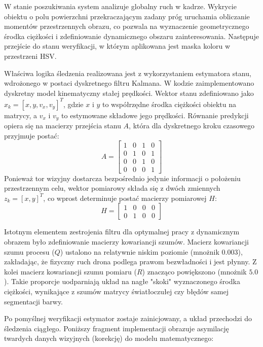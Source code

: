 \documentclass[a4paper,twoside,12pt]{book}
\begin{document}
W stanie poszukiwania system analizuje globalny ruch w kadrze. Wykrycie obiektu o polu powierzchni przekraczającym zadany próg uruchamia obliczanie momentów przestrzennych obrazu, co pozwala na wyznaczenie geometrycznego środka ciężkości i zdefiniowanie dynamicznego obszaru zainteresowania. Następuje przejście do stanu weryfikacji, w którym aplikowana jest maska koloru w przestrzeni HSV.

Właściwa logika śledzenia realizowana jest z wykorzystaniem estymatora stanu, wdrożonego w postaci dyskretnego filtru Kalmana. W kodzie zaimplementowano dyskretny model kinematyczny stałej prędkości. Wektor stanu zdefiniowano jako $x_k = [x, y, v_x, v_y]^T$, gdzie $x$ i $y$ to współrzędne środka ciężkości obiektu na matrycy, a $v_x$ i $v_y$ to estymowane składowe jego prędkości. Równanie predykcji opiera się na macierzy przejścia stanu $A$, która dla dyskretnego kroku czasowego przyjmuje postać:
\begin{equation}
A = \begin{bmatrix}
1 & 0 & 1 & 0 \\
0 & 1 & 0 & 1 \\
0 & 0 & 1 & 0 \\
0 & 0 & 0 & 1
\end{bmatrix}
\end{equation}
Ponieważ tor wizyjny dostarcza bezpośrednio jedynie informacji o położeniu przestrzennym celu, wektor pomiarowy składa się z dwóch zmiennych $z_k = [x, y]^T$, co wprost determinuje postać macierzy pomiarowej $H$:
\begin{equation}
H = \begin{bmatrix}
1 & 0 & 0 & 0 \\
0 & 1 & 0 & 0
\end{bmatrix}
\end{equation}

Istotnym elementem zestrojenia filtru dla optymalnej pracy z dynamicznym obrazem było zdefiniowanie macierzy kowariancji szumów. Macierz kowariancji szumu procesu ($Q$) ustalono na relatywnie niskim poziomie (mnożnik $0.003$), zakładając, że fizyczny ruch drona podlega prawom bezwładności i jest płynny. Z kolei macierz kowariancji szumu pomiaru ($R$) znacząco powiększono (mnożnik $5.0$). Takie proporcje uodparniają układ na nagłe "skoki" wyznaczonego środka ciężkości, wynikające z szumów matrycy światłoczułej czy błędów samej segmentacji barwy.

Po pomyślnej weryfikacji estymator zostaje zainicjowany, a układ przechodzi do śledzenia ciągłego. Poniższy fragment implementacji obrazuje asymilację twardych danych wizyjnych (korekcję) do modelu matematycznego:
\end{document}
